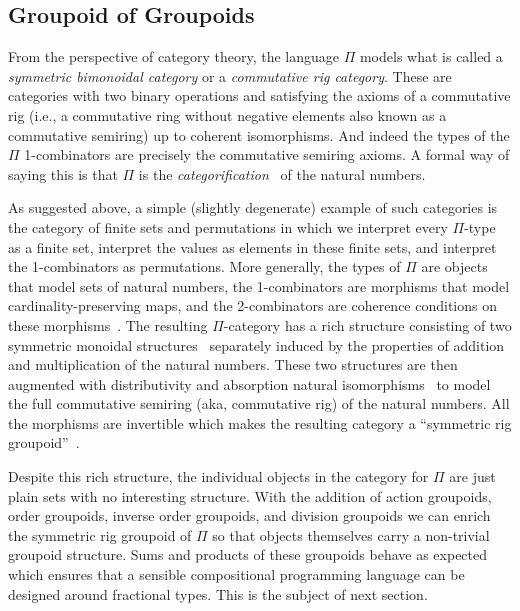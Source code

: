 
\subsection{Groupoid of Groupoids}

From the perspective of category theory, the language $\Pi$ models
what is called a \emph{symmetric bimonoidal category} or a
\emph{commutative rig category}. These are categories with two binary
operations and satisfying the axioms of a commutative rig (i.e., a
commutative ring without negative elements also known as a commutative
semiring) up to coherent isomorphisms. And indeed the types of the
$\Pi$ 1-combinators are precisely the commutative semiring axioms. A
formal way of saying this is that $\Pi$ is the
\emph{categorification}~\cite{math/9802029} of the natural numbers. 

As suggested above, a simple (slightly degenerate) example of such
categories is the category of finite sets and permutations in which we
interpret every $\Pi$-type as a finite set, interpret the values as
elements in these finite sets, and interpret the 1-combinators as
permutations. More generally, the types of $\Pi$ are objects that
model sets of natural numbers, the 1-combinators are morphisms that
model cardinality-preserving maps, and the 2-combinators are coherence
conditions on these morphisms~\cite{Carette2016}. The resulting
$\Pi$-category has a rich structure consisting of two symmetric
monoidal structures~\cite{nla.cat-vn1051288} separately induced by the
properties of addition and multiplication of the natural
numbers. These two structures are then augmented with distributivity
and absorption natural isomorphisms~\cite{laplaza} to model the full
commutative semiring (aka, commutative rig) of the natural
numbers. All the morphisms are invertible which makes the resulting
category a ``symmetric rig groupoid''~\cite{nlabrig}.

Despite this rich structure, the individual objects in the category
for $\Pi$ are just plain sets with no interesting structure. With the
addition of action groupoids, order groupoids, inverse order
groupoids, and division groupoids we can enrich the symmetric rig
groupoid of $\Pi$ so that objects themselves carry a non-trivial
groupoid structure. Sums and products of these groupoids behave as
expected which ensures that a sensible compositional programming
language can be designed around fractional types. This is the subject
of next section.

